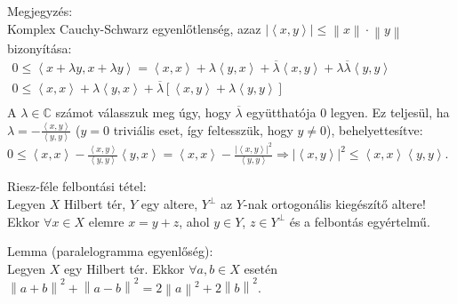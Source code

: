 \documentclass[12pt,a4paper]{scrartcl}
\newenvironment{tetel}{}{}
\newenvironment{allitas}{}{}
\newenvironment{megjegyzes}{}{}
\begin{document}
\begin{megjegyzes}

Megjegyzés:\\
Komplex Cauchy-Schwarz egyenlőtlenség, azaz
\(\left| \left\langle {x,y} \right\rangle \right| \leq \left\| x \right\| \cdot \left\| y \right\|\)
bizonyítása:\\
\(\begin{array}{l} {0 \leq \left\langle {x + \lambda y,x + \lambda y} \right\rangle = \left\langle {x,x} \right\rangle + \lambda\left\langle {y,x} \right\rangle + \overline{\lambda}\left\langle {x,y} \right\rangle + \lambda\overline{\lambda}\left\langle {y,y} \right\rangle} \\ {0 \leq \left\langle {x,x} \right\rangle + \lambda\left\langle {y,x} \right\rangle + \overline{\lambda}\left\lbrack {\left\langle {x,y} \right\rangle + \lambda\left\langle {y,y} \right\rangle} \right\rbrack} \\ \end{array}\)\\
A \(\lambda \in {\mathbb{C}}\) számot válasszuk meg úgy, hogy
\(\overline{\lambda}\) együtthatója 0 legyen. Ez teljesül, ha
\(\lambda = - \frac{\left\langle {x,y} \right\rangle}{\left\langle {y,y} \right\rangle}\)
(\(y = 0\) triviális eset, így feltesszük, hogy \(y \neq 0\)),
behelyettesítve:
\(\left. 0 \leq \left\langle {x,x} \right\rangle - \frac{\left\langle {x,y} \right\rangle}{\left\langle {y,y} \right\rangle}\left\langle {y,x} \right\rangle = \left\langle {x,x} \right\rangle - \frac{\left| \left\langle {x,y} \right\rangle \right|^{2}}{\left\langle {y,y} \right\rangle}\Rightarrow\left| \left\langle {x,y} \right\rangle \right|^{2} \leq \left\langle {x,x} \right\rangle\left\langle {y,y} \right\rangle \right.\).

\end{megjegyzes}

\begin{tetel}

Riesz-féle felbontási tétel:\\
Legyen \(X\) Hilbert tér, \(Y\) egy altere, \(Y^{\bot}\) az \(Y\)-nak
ortogonális kiegészítő altere! Ekkor \(\forall x \in X\) elemre
\(x = y + z\), ahol \(y \in Y\), \(z \in Y^{\bot}\) és a felbontás
egyértelmű.

\end{tetel}

\begin{allitas}

Lemma (paralelogramma egyenlőség):\\
Legyen \(X\) egy Hilbert tér. Ekkor \(\forall a,b \in X\) esetén
\(\left\| {a + b} \right\|^{2} + \left\| {a - b} \right\|^{2} = 2\left\| a \right\|^{2} + 2\left\| b \right\|^{2}\).

\end{allitas}
\end{document}
